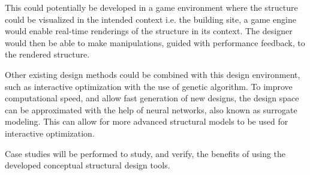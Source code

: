 This could potentially be developed in a game environment where the structure could be visualized in the intended context i.e. the building site, a game engine would enable real-time renderings of the structure in its context. The designer would then be able to make manipulations, guided with performance feedback, to the rendered structure. 

Other existing design methods could be combined with this design environment, such as interactive optimization with the use of genetic algorithm. To improve computational speed, and allow fast generation of new designs, the design space can be approximated with the help of neural networks, also known as surrogate modeling. This can allow for more advanced structural models to be used for interactive optimization.

Case studies will be performed to study, and verify, the benefits of using the developed conceptual structural design tools. 